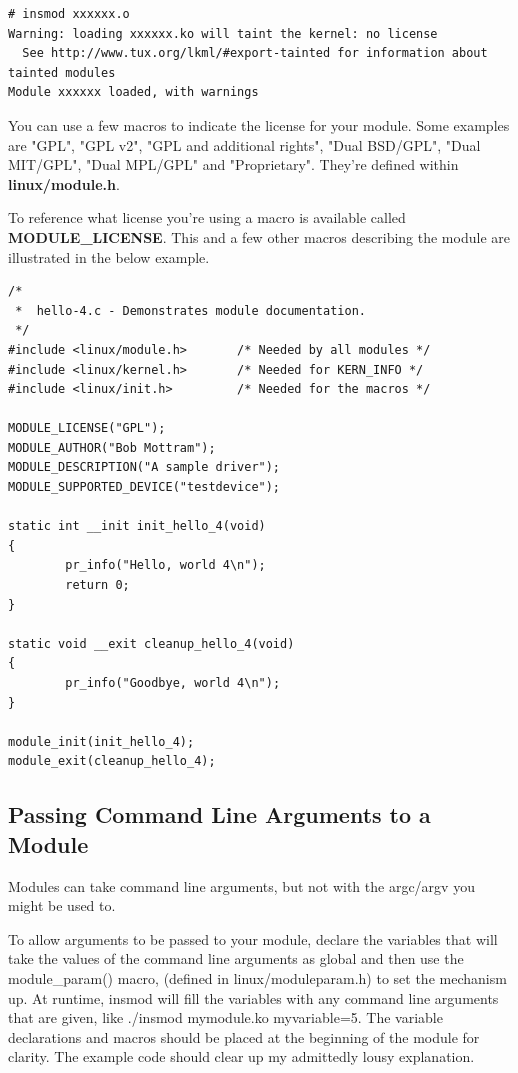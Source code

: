\documentclass[11pt]{article}
\begin{document}
\begin{verbatim}
# insmod xxxxxx.o
Warning: loading xxxxxx.ko will taint the kernel: no license
  See http://www.tux.org/lkml/#export-tainted for information about tainted modules
Module xxxxxx loaded, with warnings
\end{verbatim}

You can use a few macros to indicate the license for your module. Some examples are "GPL", "GPL v2", "GPL and additional rights", "Dual BSD/GPL", "Dual MIT/GPL", "Dual MPL/GPL" and "Proprietary". They're defined within \textbf{linux/module.h}.

To reference what license you're using a macro is available called \textbf{MODULE\_LICENSE}. This and a few other macros describing the module are illustrated in the below example.

\begin{verbatim}
/*
 *  hello-4.c - Demonstrates module documentation.
 */
#include <linux/module.h>       /* Needed by all modules */
#include <linux/kernel.h>       /* Needed for KERN_INFO */
#include <linux/init.h>         /* Needed for the macros */

MODULE_LICENSE("GPL");
MODULE_AUTHOR("Bob Mottram");
MODULE_DESCRIPTION("A sample driver");
MODULE_SUPPORTED_DEVICE("testdevice");

static int __init init_hello_4(void)
{
        pr_info("Hello, world 4\n");
        return 0;
}

static void __exit cleanup_hello_4(void)
{
        pr_info("Goodbye, world 4\n");
}

module_init(init_hello_4);
module_exit(cleanup_hello_4);
\end{verbatim}

\subsection*{Passing Command Line Arguments to a Module}
\label{sec-4-5}
Modules can take command line arguments, but not with the argc/argv you might be used to.

To allow arguments to be passed to your module, declare the variables that will take the values of the command line arguments as global and then use the module\_param() macro, (defined in linux/moduleparam.h) to set the mechanism up. At runtime, insmod will fill the variables with any command line arguments that are given, like ./insmod mymodule.ko myvariable=5. The variable declarations and macros should be placed at the beginning of the module for clarity. The example code should clear up my admittedly lousy explanation.
\end{document}
